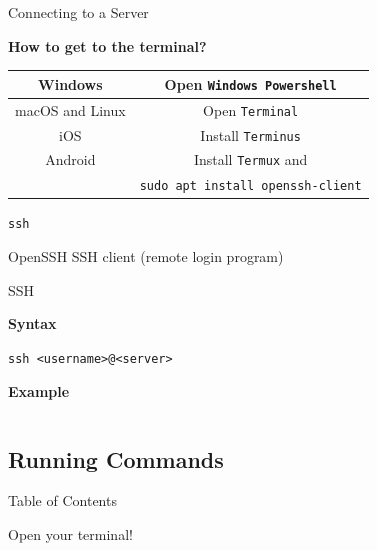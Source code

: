\documentclass{beamer}
\begin{document}
\begin{frame}{Connecting to a Server}
	\begin{Large}
		\textbf{How to get to the terminal?} \\
	\end{Large}
	\begin{tabular}{|c|c|}
		\hline
		Windows & Open \texttt{Windows Powershell} \\
		\hline
		macOS and Linux & Open \texttt{Terminal} \\
		\hline
		iOS & Install \texttt{Terminus} \\
		\hline
		Android & Install \texttt{Termux} and \\
		& \texttt{sudo apt install openssh-client} \\
		\hline
	\end{tabular}
\end{frame}

\begin{frame}
	\begin{center}
		\begin{Huge}
			\texttt{ssh} \\
		\end{Huge}
		OpenSSH SSH client (remote login program)
	\end{center}
\end{frame}

\begin{frame}{SSH}
	\begin{Large}
		\textbf{Syntax} \\
	\end{Large}
	\texttt{ssh <username>@<server>}

	\vspace{0.3cm}

	\begin{Large}
		\textbf{Example} \\
	\end{Large}
	\inputminted{shell-session}{ssh.txt}
\end{frame}

\subsection{Running Commands}
\begin{frame}{Table of Contents}
	\tableofcontents[currentsection]
\end{frame}

\begin{frame}
	\begin{center}
		\Huge Open your terminal!
	\end{center}
\end{frame}
\end{document}
